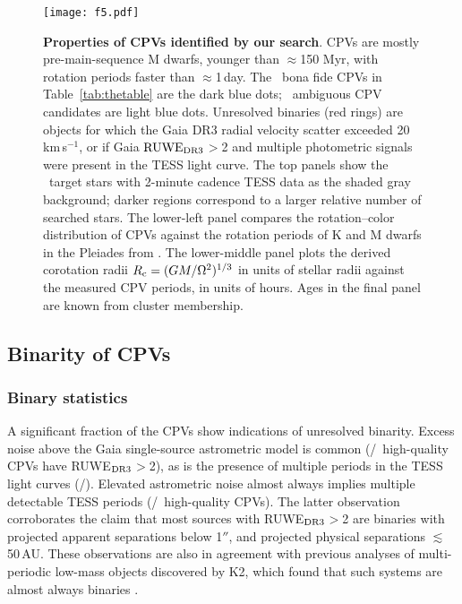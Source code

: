 \documentclass[11pt,twocolumn,tighten,linenumbers]{aastex63}
\newcommand{\kms}{{km\,s$^{-1}$}}
\begin{document}
\begin{figure*}[!t]
	\begin{center}
		\centering
		\texttt{[image: f5.pdf]}
		\vspace{-0.1cm}
		\caption{
			{\bf Properties of CPVs identified by our search}.
      CPVs are mostly pre-main-sequence M dwarfs, younger than
      $\approx$150 Myr, with rotation periods faster than
      $\approx$1\,day.  The \ngoods\ bona fide CPVs in
      Table~\ref{tab:thetable} are the dark blue dots; \nmaybes\
      ambiguous CPV candidates are light blue dots.  Unresolved
      binaries (red rings) are objects for which the Gaia DR3 radial
      velocity scatter exceeded 20\,\kms, or if Gaia ${\rm RUWE}_{\rm
      DR3}$$>$2 and multiple photometric signals were present in the
      TESS light curve.  The top panels show the \nstarssearched\
      target stars with 2-minute cadence TESS data as the shaded gray
      background; darker regions correspond to a larger relative
      number of searched stars.  The lower-left panel compares the
      rotation--color distribution of CPVs against the rotation
      periods of K and M dwarfs in the Pleiades from
      \citet{2016AJ....152..114R}.  The lower-middle panel plots the
      derived corotation radii $R_{\rm c} = (GM/\Omega^2)^{1/3}$ in
      units of stellar radii against the measured CPV periods, in
      units of hours.  Ages in the final panel are known from cluster
      membership.
		}
		\label{fig:catalogscatter}
	\end{center}
\end{figure*}



\subsection{Binarity of CPVs}
\label{subsec:resultsbinarity}

\subsubsection{Binary statistics}

A significant fraction of the CPVs show indications of unresolved
binarity.  Excess noise above the Gaia single-source astrometric model
is common (\ngoodhighruwe/\ngoods\ high-quality CPVs have RUWE$_{\rm
DR3}$$>$2), as is the presence of multiple periods in the TESS light
curves (\ngoodmultperiodflag/\ngoods).  Elevated astrometric noise
almost always implies multiple detectable TESS periods
(\ngoodruweandmultperiod/\ngoodhighruwe\ high-quality CPVs).  The
latter observation corroborates the claim that most sources with
RUWE$_{\rm DR3}$$>$2 are binaries with projected apparent separations
below 1$''$, and projected physical separations $\lesssim$50\,AU.
These observations are also in agreement with previous analyses of
multi-periodic low-mass objects discovered by K2, which found that
such systems are almost always binaries
\citep{2018AJ....156..138T,2018AJ....156..275S}.
\end{document}

